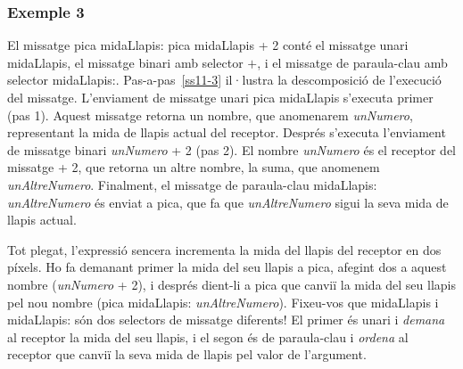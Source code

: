 \subsubsection*{Exemple 3}

El missatge \textsf{pica midaLlapis: pica midaLlapis + 2} conté el missatge unari \textsf{midaLlapis}, el missatge binari amb selector \textsf{$+$}, i el missatge de paraula-clau amb selector \textsf{midaLlapis:}. Pas-a-pas~\ref{ss11-3} il·lustra la descomposició de l'execució del missatge. L'enviament de missatge unari \textsf{pica midaLlapis} s'executa primer (pas 1). Aquest missatge retorna un nombre, que anomenarem \textsf{{\itshape unNumero}}, representant la mida de llapis actual  del receptor. Després s'executa l'enviament de missatge binari \textsf{{\itshape unNumero} + 2} (pas 2). El nombre \textsf{{\itshape unNumero}} és el receptor del missatge \textsf{+ 2}, que retorna un altre nombre, la suma, que anomenem \textsf{{\itshape unAltreNumero}}. Finalment, el missatge de paraula-clau \textsf{midaLlapis: {\itshape unAltreNumero}} és enviat a \textsf{pica}, que fa que \textsf{{\itshape unAltreNumero}} sigui la seva mida de llapis actual.

Tot plegat, l'expressió sencera incrementa la mida del llapis del receptor en dos píxels. Ho fa demanant primer la mida del seu llapis a \textsf{pica}, afegint dos a aquest nombre (\textsf{{\itshape unNumero} + 2}), i després dient-li a \textsf{pica} que canviï la mida del seu llapis pel nou nombre (\textsf{pica midaLlapis: {\itshape unAltreNumero}}). Fixeu-vos que \textsf{midaLlapis} i \textsf{midaLlapis:} són dos selectors de missatge diferents! El primer és unari i \emph{demana} al receptor la mida del seu llapis, i el segon és de paraula-clau i \emph{ordena} al receptor que canviï la seva mida de llapis pel valor de l'argument.

